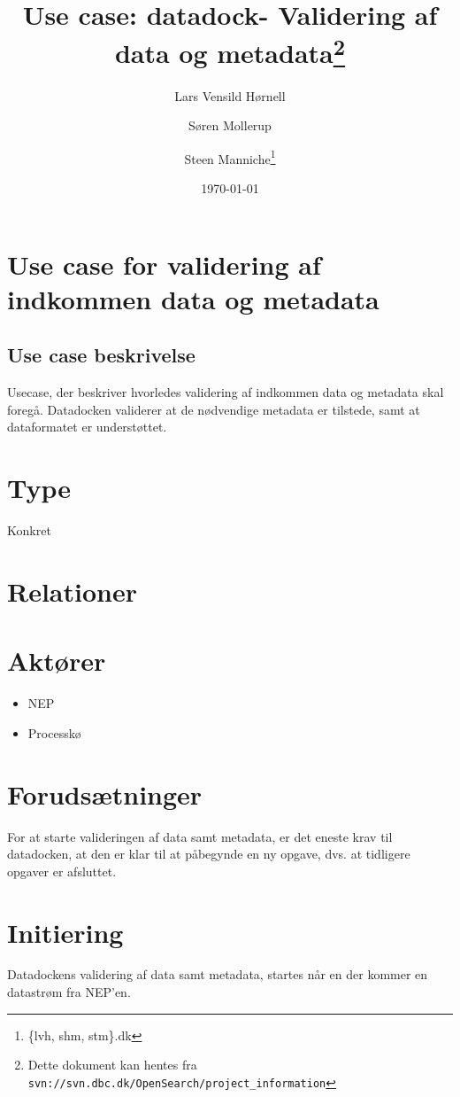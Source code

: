 \documentclass{article}
\author{Lars Vensild Hørnell \and Søren Mollerup \and Steen
  Manniche\thanks{\{lvh, shm, stm\}\@dbc.dk}}
\date{\today}
\title{Use case: datadock- Validering af data og metadata\thanks{Dette dokument kan hentes fra \texttt{svn://svn.dbc.dk/OpenSearch/project\_information}}}
\begin{document}
\maketitle

\newpage

\tableofcontents

\section{Use case for validering af indkommen data og metadata}

\subsection{Use case beskrivelse}
Usecase, der beskriver hvorledes validering af indkommen data og metadata skal foregå.
Datadocken validerer at de nødvendige metadata er tilstede, samt at dataformatet er understøttet.

\section{Type}
Konkret

\section{Relationer}

\section{Aktører}
\begin{itemize}
\item NEP
\item Processkø
\end{itemize}


\section{Forudsætninger}
For at starte valideringen af data samt metadata, er det eneste krav
til datadocken, at den er klar til at påbegynde en ny opgave, dvs. at
tidligere opgaver er afsluttet.

\section{Initiering}
Datadockens validering af data samt metadata, startes når en der
kommer en datastrøm fra NEP'en.
\end{document}

